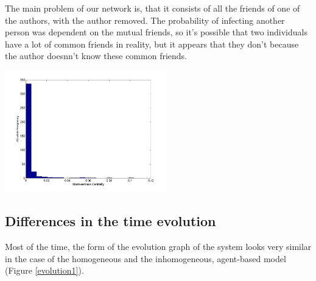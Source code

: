 \begin{minipage}{0.5\textwidth}
The main problem of our network is, that it consists of all the friends of one of the authors, with the author removed. The probability of infecting another person was dependent on the mutual friends, so it's possible that two individuals have a lot of common friends in reality, but it appears that they don't because the author doesnn't know these common friends.
\end{minipage}
\begin{minipage}{0.5\textwidth}
\includegraphics[width=7cm]{network_centralityhist.png}
\label{hist2}
\end{minipage}




\subsection{Differences in the time evolution}

Most of the time, the form of the evolution graph of the system looks very similar in the case of the homogeneous and the inhomogeneous, agent-based model (Figure \ref{evolution1}).

